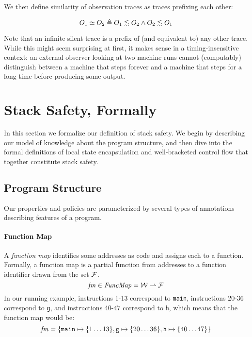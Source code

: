 \documentclass[acmsmall,review,anonymous]{acmart}\settopmatter{printfolios=true,printccs=false,printacmref=false}
\begin{document}
We then define similarity of observation traces as traces prefixing each other:

\[O_1 \simeq O_2 \triangleq O_1 \lesssim O_2 \land O_2 \lesssim O_1\]
%

Note that an infinite silent trace is a
prefix of (and equivalent to) any other trace. While this might seem
surprising at first, it makes sense in a timing-insensitive context:
an external observer looking at two machine runs cannot (computably)
distinguish between a machine that steps forever and a machine that
steps for a long time before producing some output.

\section{Stack Safety, Formally}
\label{sec:lse-and-wbcf}

In this section we formalize our definition of stack safety. We begin
by describing our model of knowledge about the program structure, and
then dive into the formal definitions of local state encapsulation and
well-bracketed control flow that together constitute stack safety.

\subsection{Program Structure}

Our properties and policies are parameterized by several types of
annotations describing features of a program.

\paragraph*{Function Map}

A {\em function map} identifies some addresses as code and assigns
each to a function. Formally, a function map is a
partial function from addresses to a function
identifier drawn from the set \(\mathcal{F}\).
\[\mathit{fm} \in \mathit{FuncMap} = {\mathcal W} \rightharpoonup \mathcal{F}\]
%
In our running example, instructions 1-13 correspond to {\tt main},
instructions 20-36 correspond to {\tt g}, and instructions 40-47
correspond to {\tt h}, which means that the function map would be:
\[ \mathit{fm} = \{\texttt{main} \mapsto \{1\ldots13\}, \texttt{g} \mapsto \{20\ldots36\}, \texttt{h} \mapsto \{40\ldots47\}\}\]
\end{document}
